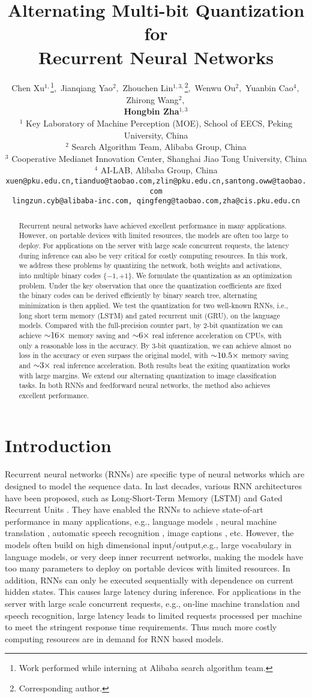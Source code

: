 \documentclass{article} %
\title{Alternating Multi-bit Quantization for \\ Recurrent Neural Networks}
\author{\small{Chen Xu$^{1,}$\thanks{Work performed while interning at Alibaba  search algorithm team.}$,$ Jianqiang Yao$^2,$ Zhouchen Lin$^{1,3,}$\thanks{Corresponding author.}$,$ Wenwu Ou$^2,$ Yuanbin Cao$^4,$ Zhirong Wang$^2,$}
	\\ \textbf{\small{Hongbin Zha}}$^{1,3}$ \\
	$^1$ Key Laboratory of Machine Perception (MOE), School of EECS, Peking University, China\\
	$^2$ Search Algorithm Team, Alibaba Group, China \\
	$^3$ Cooperative Medianet Innovation Center, Shanghai Jiao Tong University, China\\
	$^4$ AI-LAB, Alibaba Group, China \\
\texttt{\small xuen@pku.edu.cn,tianduo@taobao.com,zlin@pku.edu.cn,santong.oww@taobao.com}\\
\texttt{\small lingzun.cyb@alibaba-inc.com, qingfeng@taobao.com,zha@cis.pku.edu.cn} \\
}
\newcommand{\<}{\left\langle}
\renewcommand{\>}{\right\rangle}
\begin{document}
\maketitle

\begin{abstract}
Recurrent neural networks have achieved excellent performance in many applications. However, on portable devices with limited resources, the models are often too large to deploy. For applications on the server with large scale concurrent requests, the latency during inference can also be very critical for costly computing resources. In this work, we address these problems by quantizing the network, both weights and activations, into multiple binary codes $\{-1,+1\}$. We formulate the quantization as an optimization problem. Under the key observation that once the quantization coefficients are fixed the binary codes can be derived efficiently by binary search tree, alternating minimization is then applied.  We test the quantization for two well-known RNNs, i.e., long short term memory (LSTM) and gated recurrent unit (GRU), on the language models. Compared with the full-precision counter part, by $2$-bit quantization we can achieve $\scriptsize{\sim} 16 \times$ memory saving and  $\scriptsize{\sim} 6 \times$ real inference acceleration on CPUs, with only a reasonable loss in the accuracy. By $3$-bit quantization, we can achieve almost no loss in the accuracy or even surpass the original model, with $\scriptsize{\sim} 10.5 \times$ memory saving and $\scriptsize{\sim}3 \times$ real inference acceleration. Both results beat the exiting quantization works with large margins.  We extend our alternating quantization to image classification tasks. In both RNNs and feedforward neural networks, the method also achieves  excellent performance.
\end{abstract}

\section{Introduction}
Recurrent neural networks (RNNs) are specific type of neural networks which are designed to model the sequence data. In last decades, various RNN architectures have been proposed, such as Long-Short-Term Memory (LSTM) \citep{lstm} and Gated Recurrent Units \cite{gru}. They have enabled the RNNs to achieve 
state-of-art performance in many applications, e.g., language models \citep{languagemodel}, neural machine translation \citep{sequence1, sequence2}, automatic speech recognition \citep{speech}, image captions \citep{imagecaption}, etc. However, the models often build on high dimensional input/output,e.g., large vocabulary in language models, or very deep inner recurrent networks, making the models have too many parameters to deploy on portable devices with limited resources. In addition, RNNs can only be executed sequentially with dependence on current hidden states. This causes large latency during inference. For applications in the server with large scale concurrent requests, e.g., on-line machine translation and speech recognition, large latency leads to limited requests processed per machine to meet the stringent response time requirements. Thus much more costly computing resources are in demand for RNN based models.
\end{document}
